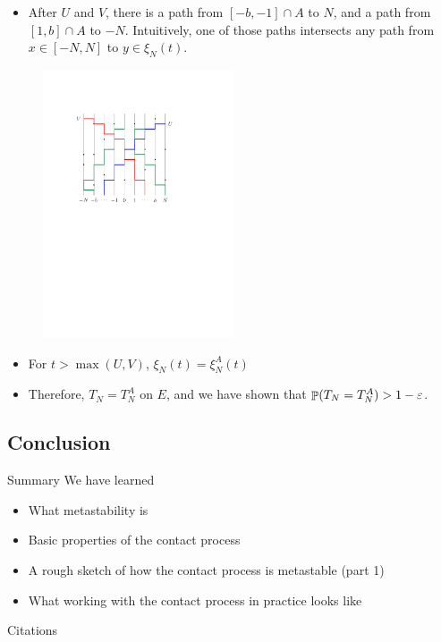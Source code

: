 \documentclass{beamer}
\newcommand{\ep}{\varepsilon}
\begin{document}
\begin{frame}
  \begin{itemize}
    \item After $U$ and $V$, there is a path from $[-b,-1] \cap A$ to $N$, and a path from $[1,b] \cap A$ to $-N$. Intuitively, one of those paths intersects any path from $x \in [-N,N]$ to $y \in \xi_{N}(t)$.
  \end{itemize}
  \begin{figure}
    \centering
    \includegraphics[width=0.5\textwidth]{U_V_blocked.pdf}
  \end{figure}
\end{frame}

\begin{frame}
  \begin{itemize}
    \item For $t > \max(U,V)$, $\xi_{N}(t) = \xi_{N}^{A}(t)$
    \item Therefore, $T_{N} = T_{N}^{A}$ on $E$, and we have shown that $\Prob(T_{N} = T_{N}^{A}) > 1 - \ep$.
  \end{itemize}
\end{frame}

\subsection{Conclusion}

\begin{frame}{Summary}
  We have learned
  \begin{itemize}
          \pause
    \item What metastability is
          \pause
    \item Basic properties of the contact process
          \pause
    \item A rough sketch of how the contact process is metastable (part 1)
          \pause
    \item What working with the contact process in practice looks like
  \end{itemize}
\end{frame}

\begin{frame}{Citations}
  \printbibliography
\end{frame}
\end{document}
